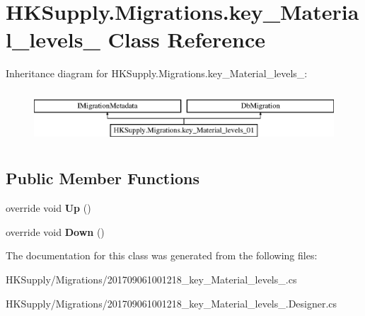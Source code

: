 \hypertarget{class_h_k_supply_1_1_migrations_1_1key___material__levels__01}{}\section{H\+K\+Supply.\+Migrations.\+key\+\_\+\+Material\+\_\+levels\+\_ Class Reference}
\label{class_h_k_supply_1_1_migrations_1_1key___material__levels__01}
Inheritance diagram for H\+K\+Supply.\+Migrations.\+key\+\_\+\+Material\+\_\+levels\+\_\+:\begin{figure}[H]
\begin{center}
\leavevmode
\includegraphics[height=2.000000cm]{class_h_k_supply_1_1_migrations_1_1key___material__levels__01}
\end{center}
\end{figure}
\subsection*{Public Member Functions}
\begin{DoxyCompactItemize}
\item 
\mbox{\label{class_h_k_supply_1_1_migrations_1_1key___material__levels__01_a9f47734fe393db28b669cd91f259d8ba}} 
override void {\bfseries Up} ()
\item 
\mbox{\label{class_h_k_supply_1_1_migrations_1_1key___material__levels__01_a361a0bff58c255fe49a05002e61d2650}} 
override void {\bfseries Down} ()
\end{DoxyCompactItemize}


The documentation for this class was generated from the following files\+:\begin{DoxyCompactItemize}
\item 
H\+K\+Supply/\+Migrations/201709061001218\+\_\+key\+\_\+\+Material\+\_\+levels\+\_.\+cs\item 
H\+K\+Supply/\+Migrations/201709061001218\+\_\+key\+\_\+\+Material\+\_\+levels\+\_.\+Designer.\+cs\end{DoxyCompactItemize}
